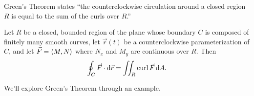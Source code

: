 Green's Theorem states ``the counterclockwise circulation around a closed region $R$ is equal to the sum of the curls over $R$.''

\begin{theorem}\label{thm:greens}%
Let $R$ be a closed, bounded region of the plane whose boundary $C$ is composed of finitely many smooth curves, let $\vec r(t)$ be a counterclockwise parameterization of $C$, and let $\vec F =\left\langle M,N\right\rangle$ where $N_x$ and $M_y$ are continuous over $R$. Then
\[\oint_C \vec F\cdot\operatorname{d}\!\vec r = \iint_R\operatorname{curl} \vec F\operatorname{d}\! A.\]
\end{theorem}


We'll explore Green's Theorem through an example.

